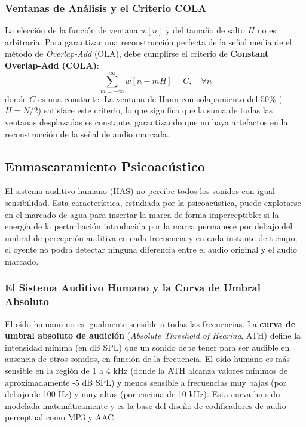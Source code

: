 \subsubsection{Ventanas de Análisis y el Criterio COLA}

La elección de la función de ventana $w[n]$ y del tamaño de salto $H$ no es arbitraria. Para garantizar una reconstrucción perfecta de la señal mediante el método de \textit{Overlap-Add} (OLA), debe cumplirse el criterio de \textbf{Constant Overlap-Add (COLA)}:
\begin{equation}
    \sum_{m=-\infty}^{\infty} w[n - mH] = C, \quad \forall n
\end{equation}
donde $C$ es una constante. La ventana de Hann con solapamiento del 50\% ($H = N/2$) satisface este criterio, lo que significa que la suma de todas las ventanas desplazadas es constante, garantizando que no haya artefactos en la reconstrucción de la señal de audio marcada.

\subsection{Enmascaramiento Psicoacústico}
\label{sec:psicoacustica}

El sistema auditivo humano (HAS) no percibe todos los sonidos con igual sensibilidad. Esta característica, estudiada por la psicoacústica, puede explotarse en el marcado de agua para insertar la marca de forma imperceptible: si la energía de la perturbación introducida por la marca permanece por debajo del umbral de percepción auditiva en cada frecuencia y en cada instante de tiempo, el oyente no podrá detectar ninguna diferencia entre el audio original y el audio marcado.

\subsubsection{El Sistema Auditivo Humano y la Curva de Umbral Absoluto}

El oído humano no es igualmente sensible a todas las frecuencias. La \textbf{curva de umbral absoluto de audición} (\textit{Absolute Threshold of Hearing}, ATH) define la intensidad mínima (en dB SPL) que un sonido debe tener para ser audible en ausencia de otros sonidos, en función de la frecuencia. El oído humano es más sensible en la región de 1 a 4 kHz (donde la ATH alcanza valores mínimos de aproximadamente -5 dB SPL) y menos sensible a frecuencias muy bajas (por debajo de 100 Hz) y muy altas (por encima de 10 kHz). Esta curva ha sido modelada matemáticamente y es la base del diseño de codificadores de audio perceptual como MP3 y AAC.

